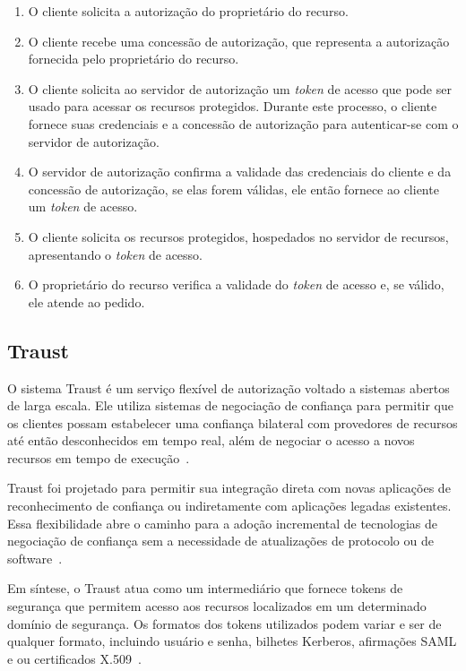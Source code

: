 \begin{enumerate}[a )]
        \item O cliente solicita a autorização do proprietário do recurso.
        \item O cliente recebe uma concessão de autorização, que representa a autorização fornecida pelo proprietário do recurso.
        \item O cliente solicita ao servidor de autorização um \emph{token} de acesso que pode ser usado para acessar os recursos protegidos. Durante este processo, o cliente fornece suas credenciais e a concessão de autorização para autenticar-se com o servidor de autorização.
        \item O servidor de autorização confirma a validade das credenciais do cliente e da concessão de autorização, se elas forem válidas, ele então fornece ao cliente um \emph{token} de acesso.
        \item O cliente solicita os recursos protegidos, hospedados no servidor de recursos, apresentando o \emph{token} de acesso.
        \item  O proprietário do recurso verifica a validade do \emph{token} de acesso e, se válido, ele atende ao pedido.

\end{enumerate}

\subsection{Traust}

O sistema Traust é um serviço flexível de autorização voltado a sistemas abertos de larga escala. Ele utiliza sistemas de negociação de confiança para permitir que os clientes possam estabelecer uma confiança bilateral com provedores de recursos até então desconhecidos em tempo real, além de negociar o acesso a novos recursos em tempo de execução~\cite{traust08}.

Traust foi projetado para permitir sua integração direta com novas aplicações de reconhecimento de confiança ou indiretamente com aplicações legadas existentes. Essa flexibilidade abre o caminho para a adoção incremental de tecnologias de negociação de confiança sem a necessidade de atualizações de protocolo ou de software~\cite{traust08}.

Em síntese, o Traust atua como um intermediário que fornece tokens de segurança que permitem acesso aos recursos localizados em um determinado domínio de segurança. Os formatos dos tokens utilizados podem variar e ser de qualquer formato, incluindo usuário e senha, bilhetes Kerberos, afirmações SAML e ou certificados X.509~\cite{traust08}.

